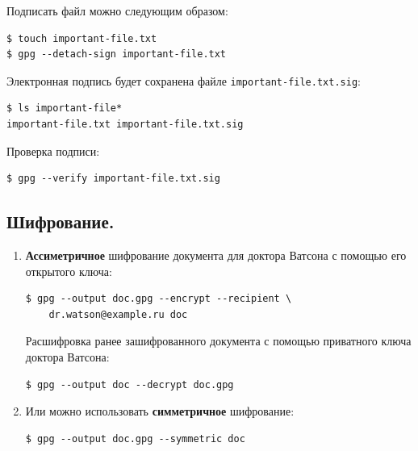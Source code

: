 \documentclass[presentation]{beamer}
\newcommand{\EndOfSectionOrnament}{
  \begin{center}
    \pgfornament[width=0.5\textwidth]{88}
    \end{center}
}
\begin{document}
\begin{frame}[fragile]{}
  Подписать файл можно следующим образом:
\begin{verbatim}
$ touch important-file.txt
$ gpg --detach-sign important-file.txt
\end{verbatim}

  Электронная подпись будет сохранена файле
  \texttt{important-file.txt.sig}:
\begin{verbatim}
$ ls important-file*
important-file.txt important-file.txt.sig
\end{verbatim}

  Проверка подписи:
\begin{verbatim}
$ gpg --verify important-file.txt.sig
\end{verbatim}

  \EndOfSectionOrnament
\end{frame}



\subsection{Шифрование.}

\begin{frame}[fragile]{}
  \begin{enumerate}
    
  \item \textbf{Ассиметричное} шифрование документа для доктора
    Ватсона с помощью его открытого ключа:
\begin{verbatim}
$ gpg --output doc.gpg --encrypt --recipient \
    dr.watson@example.ru doc
\end{verbatim}

  Расшифровка ранее зашифрованного документа с помощью приватного
  ключа доктора Ватсона:
\begin{verbatim}
$ gpg --output doc --decrypt doc.gpg
\end{verbatim}

\item Или можно использовать \textbf{симметричное} шифрование:
\begin{verbatim}
$ gpg --output doc.gpg --symmetric doc
\end{verbatim}
  \end{enumerate}

  \EndOfSectionOrnament
\end{frame}


\end{document}
